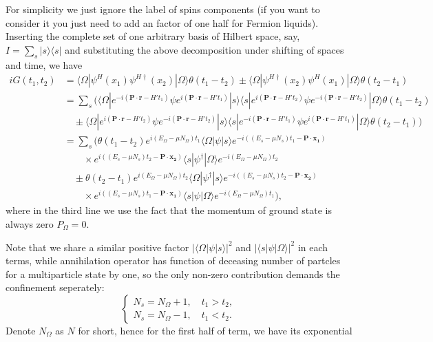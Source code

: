 \documentclass[b5paper,10pt,UTF8]{book}
\numberwithin{equation}{section}
\begin{document}
		\begin{Proof}
			For simplicity we just ignore the label of spins components (if you want to consider it you just need to add an factor of one half for Fermion liquids). Inserting the complete set of one arbitrary basis of Hilbert space, say, $\displaystyle I=\sum_{s}|s\rangle\langle s|$ and substituting the above decomposition under shifting of spaces and time, we have
			\begin{align*}
				iG(t_1,t_2)&=\langle\Omega|\psi^H(x_1)\psi^{H\dagger}(x_2)|\Omega\rangle\theta(t_1-t_2)\pm\langle\Omega|\psi^{H\dagger}(x_2)\psi^H(x_1)|\Omega\rangle\theta(t_2-t_1)\\
				&=\sum_s\bigg(\langle \Omega|e^{-i(\bm{P\cdot r}-H't_1)}\psi e^{i(\bm{P\cdot r}-H't_1)}|s\rangle\langle s|e^{i(\bm{P\cdot r}-H't_2)}\psi e^{-i(\bm{P\cdot r}-H't_2)}|\Omega\rangle\theta(t_1-t_2)\\
				&\quad\pm\langle\Omega|e^{i(\bm{P\cdot r}-H't_2)}\psi e^{-i(\bm{P\cdot r}-H't_2)}|s\rangle\langle s|e^{-i(\bm{P\cdot r}-H't_1)}\psi e^{i(\bm{P\cdot r}-H't_1)}|\Omega\rangle\theta(t_2-t_1)\bigg)\\
				&=\sum_s\bigg(\theta(t_1-t_2)e^{i(E_\Omega-\mu N_\Omega)t_1}\langle\Omega|\psi|s\rangle e^{-i((E_s-\mu N_s)t_1-\bm{P\cdot x_1})}\\
				&\qquad\times e^{i((E_s-\mu N_s)t_2-\bm{P\cdot x_2})}\langle s|\psi^\dagger|\Omega\rangle e^{-i(E_\Omega-\mu N_\Omega)t_2}\\
				&\quad\pm\theta(t_2-t_1)e^{i(E_\Omega-\mu N_\Omega)t_2}\langle\Omega|\psi^\dagger|s\rangle e^{-i((E_s-\mu N_s)t_2-\bm{P\cdot x_2})}\\
				&\qquad\times e^{i((E_s-\mu N_s)t_1-\bm{P\cdot x_1})}\langle s|\psi|\Omega\rangle e^{-i(E_\Omega-\mu N_\Omega)t_1}\bigg),
			\end{align*}
			where in the third line we use the fact that the momentum of ground state is always zero $P_\Omega=0$.\par
			Note that we share a similar positive factor $|\langle\Omega|\psi|s\rangle|^2$ and $|\langle s|\psi|\Omega\rangle|^2$ in each terms, while annihilation operator has function of deceasing number of partcles for a multiparticle state by one, so the only non-zero contribution demands the confinement seperately:
			$$\begin{cases}N_s=N_\Omega+1,\quad t_1>t_2,\\N_s=N_\Omega-1,\quad t_1<t_2.\end{cases}$$
			Denote $N_\Omega$ as $N$ for short, hence for the first half of term, we have its exponential

\end{Proof}
\end{document}
